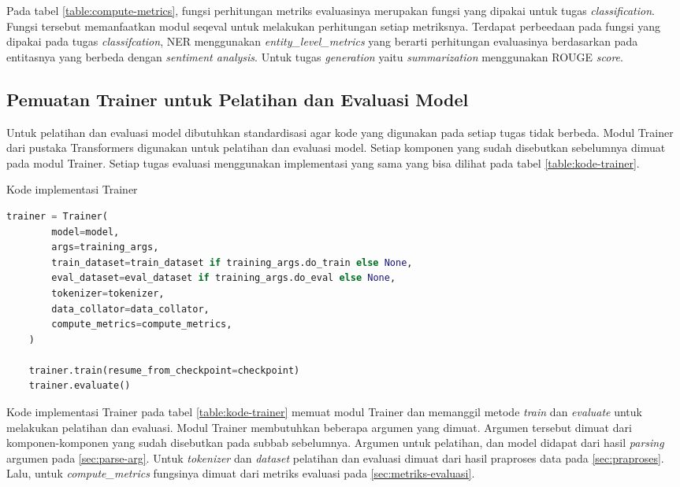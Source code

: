 Pada tabel \ref{table:compute-metrics}, fungsi perhitungan metriks evaluasinya merupakan fungsi yang dipakai untuk tugas \textit{classification}. Fungsi tersebut memanfaatkan modul seqeval untuk melakukan perhitungan setiap metriksnya. Terdapat perbeedaan pada fungsi yang dipakai pada tugas \textit{classifcation}, NER menggunakan \textit{entity\_level\_metrics} yang berarti perhitungan evaluasinya berdasarkan pada entitasnya yang berbeda dengan \textit{sentiment analysis}. Untuk tugas \textit{generation} yaitu \textit{summarization} menggunakan ROUGE \textit{score}.

\subsection{Pemuatan Trainer untuk Pelatihan dan Evaluasi Model}

Untuk pelatihan dan evaluasi model dibutuhkan standardisasi agar kode yang digunakan pada setiap tugas tidak berbeda. Modul Trainer dari pustaka Transformers digunakan untuk pelatihan dan evaluasi model. Setiap komponen yang sudah disebutkan sebelumnya  dimuat pada modul Trainer. Setiap tugas evaluasi  menggunakan implementasi yang sama yang bisa dilihat pada tabel \ref{table:kode-trainer}.

\begin{table}[h]
    \caption{Kode implementasi Trainer}
    \label{table:kode-trainer}
    \begin{lstlisting}[language=python]
    trainer = Trainer(
        model=model,
        args=training_args,
        train_dataset=train_dataset if training_args.do_train else None,
        eval_dataset=eval_dataset if training_args.do_eval else None,
        tokenizer=tokenizer,
        data_collator=data_collator,
        compute_metrics=compute_metrics,
    )

    trainer.train(resume_from_checkpoint=checkpoint)
    trainer.evaluate()
    \end{lstlisting}
\end{table}

Kode implementasi Trainer pada tabel \ref{table:kode-trainer} memuat modul Trainer dan memanggil metode \textit{train} dan \textit{evaluate} untuk melakukan pelatihan dan evaluasi. Modul Trainer membutuhkan beberapa argumen yang dimuat. Argumen tersebut dimuat dari komponen-komponen yang sudah disebutkan pada subbab sebelumnya. Argumen untuk pelatihan, dan model didapat dari hasil \textit{parsing} argumen pada \ref{sec:parse-arg}. Untuk \textit{tokenizer} dan \textit{dataset} pelatihan dan evaluasi dimuat dari hasil praproses data pada \ref{sec:praproses}. Lalu, untuk \textit{compute\_metrics} fungsinya dimuat dari metriks evaluasi pada \ref{sec:metriks-evaluasi}. 
